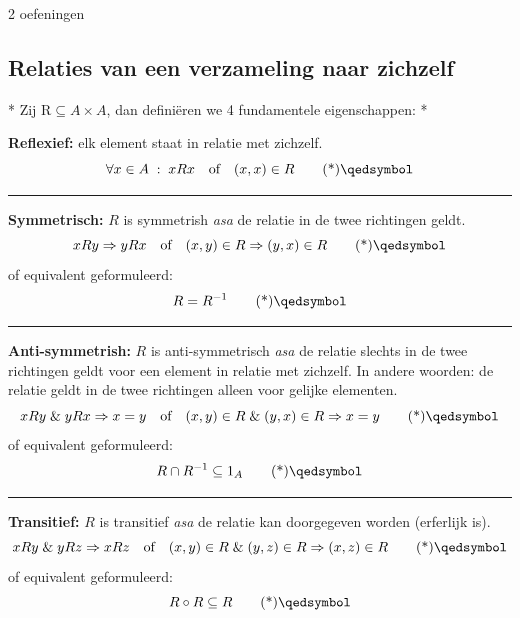 \colorbox{magenta!66}{2 oefeningen}

\subsection{Relaties van een verzameling naar zichzelf}

\begin{nicetheorem}*
    Zij $\text{R} \subseteq A \times A$, dan definiëren we 4 fundamentele eigenschappen:
    \nextpart[Eigenschappen:]*

    \textcolor{red!75!black}{\textbf{Reflexief:}} elk element staat in relatie met zichzelf.
    \begin{equation}
        \forall x \in A \; : \; xRx \quad\text{of}\quad (x,x) \in R \qedtag
    \end{equation}

    \vspace{0.5cm}
    \hrule
    \vspace{0.5cm}

    \textcolor{red!75!black}{\textbf{Symmetrisch:}} $R$ is symmetrish \emph{asa} de relatie in de twee richtingen geldt.
    \begin{equation}
        xRy \Rightarrow yRx \quad\text{of}\quad (x,y) \in R \Rightarrow (y,x) \in R \qedtag
    \end{equation}
    of equivalent geformuleerd:
    \begin{equation}
        R = R^{-1} \qedtag
    \end{equation}

    \vspace{0.5cm}
    \hrule
    \vspace{0.5cm}

    \textcolor{red!75!black}{\textbf{Anti-symmetrish:}} $R$ is anti-symmetrisch \emph{asa} de relatie slechts in de twee richtingen geldt voor een element in relatie met zichzelf. In andere woorden: de relatie geldt in de twee richtingen alleen voor gelijke elementen.
    \begin{equation}
        xRy \;\&\; yRx \Rightarrow x = y \quad \text{of} \quad (x,y) \in R \;\&\; (y,x) \in R \Rightarrow x = y \qedtag
    \end{equation}
    of equivalent geformuleerd:
    \begin{equation}
        R \cap R^{-1} \subseteq 1_A \qedtag
    \end{equation}
    \vspace{0.5cm}
    \hrule
    \vspace{0.5cm}

    \textcolor{red!75!black}{\textbf{Transitief:}} $R$ is transitief \emph{asa} de relatie kan doorgegeven worden (erferlijk is).
    \begin{equation}
        xRy \;\&\; yRz \Rightarrow xRz \quad \text{of} \quad (x,y) \in R \;\&\; (y,z) \in R \Rightarrow (x,z) \in R \qedtag
    \end{equation}
    of equivalent geformuleerd:
    \begin{equation}
        R \circ R \subseteq R \qedtag
    \end{equation}
\end{nicetheorem}

